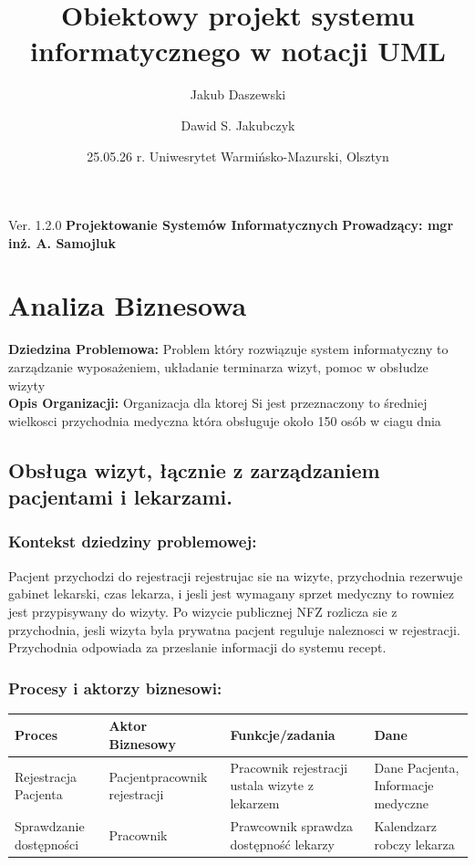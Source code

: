 \documentclass{article}
\author{Jakub Daszewski \and Dawid S. Jakubczyk}
\title{Obiektowy projekt systemu informatycznego w notacji UML}
\date{25.05.26 r. Uniwesrytet Warmińsko-Mazurski, Olsztyn}
\begin{document}
	\pagestyle{fancy}
	\begin{titlepage}
	\maketitle
	\center Ver. 1.2.0
	\center \textbf{Projektowanie Systemów Informatycznych}
	\center \textbf{Prowadzący: mgr inż. A. Samojluk} \\
	\end{titlepage}
	\tableofcontents
	\newpage
	\section{Analiza Biznesowa}	
	\justify \textbf{Dziedzina Problemowa: }Problem który rozwiązuje system informatyczny to zarządzanie wyposażeniem, układanie terminarza wizyt, pomoc w obsłudze wizyty\\
	\justify \textbf{Opis Organizacji: }Organizacja dla ktorej Si jest przeznaczony to średniej wielkosci przychodnia medyczna która obsługuje około 150 osób w ciagu dnia
	

\subsection*{Obsługa wizyt, łącznie z zarządzaniem pacjentami i lekarzami.}

\subsubsection*{Kontekst dziedziny problemowej:}

\justify Pacjent przychodzi do rejestracji rejestrujac sie na wizyte, przychodnia rezerwuje gabinet lekarski, czas lekarza, i jesli jest wymagany sprzet medyczny to rowniez jest przypisywany do wizyty. Po wizycie publicznej NFZ rozlicza sie z przychodnia, jesli wizyta byla prywatna pacjent reguluje naleznosci w rejestracji.
Przychodnia odpowiada za przeslanie informacji do systemu recept.
 
\subsubsection*{Procesy i aktorzy biznesowi:}

\begin{tabular}{|m{6em}|m{10em}|m{18em}|m{7em}|}
\hline
\rowcolor{lightgray} Proces & Aktor Biznesowy & Funkcje/zadania & Dane\\
\hline
Rejestracja Pacjenta	& Pacjent\newline pracownik rejestracji & Pracownik rejestracji ustala wizyte z lekarzem & Dane Pacjenta, Informacje medyczne\\
\hline
Sprawdzanie dostępności & Pracownik & Prawcownik sprawdza dostępność lekarzy & Kalendzarz robczy lekarza\\
\hline
\end{tabular}
\newpage
\end{document}
